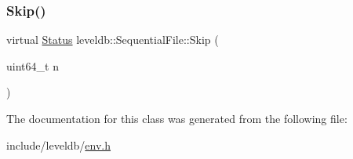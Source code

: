 \mbox{\label{classleveldb_1_1_sequential_file_a18c94279fc058cad4d03cdfe04b12179}} 
\subsubsection{\texorpdfstring{Skip()}{Skip()}}
{\footnotesize\ttfamily virtual \mbox{\hyperlink{classleveldb_1_1_status}{Status}} leveldb\+::\+Sequential\+File\+::\+Skip (\begin{DoxyParamCaption}\item[{uint64\+\_\+t}]{n }\end{DoxyParamCaption})\hspace{0.3cm}{\ttfamily [pure virtual]}}



The documentation for this class was generated from the following file\+:\begin{DoxyCompactItemize}
\item 
include/leveldb/\mbox{\hyperlink{env_8h}{env.\+h}}\end{DoxyCompactItemize}

